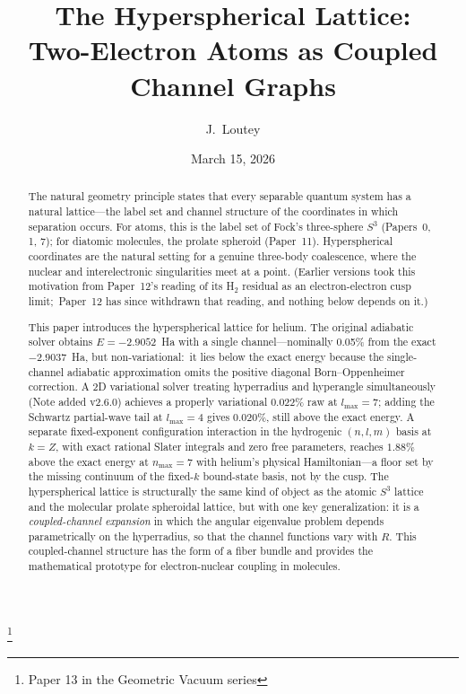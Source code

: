 \documentclass[aps,pra,twocolumn,superscriptaddress,longbibliography]{revtex4-2}
\begin{document}
\title{The Hyperspherical Lattice:\\
Two-Electron Atoms as Coupled Channel Graphs}
\thanks{Paper 13 in the Geometric Vacuum series}

\author{J.~Loutey}

\date{March 15, 2026}


\begin{abstract}
The natural geometry principle states that every separable quantum
system has a natural lattice---the label set and channel structure of
the coordinates in which separation occurs.
For atoms, this is the label set of Fock's three-sphere $S^3$ (Papers~0, 1, 7); for
diatomic molecules, the prolate spheroid (Paper~11).  Hyperspherical
coordinates are the natural setting for a genuine three-body
coalescence, where the nuclear and interelectronic singularities
meet at a point.  (Earlier versions took this motivation from
Paper~12's reading of its H$_2$ residual as an electron-electron
cusp limit;\ Paper~12 has since withdrawn that reading, and nothing
below depends on it.)

This paper introduces the hyperspherical lattice for helium.
The original adiabatic solver obtains $E = -2.9052$~Ha with a single
channel---nominally 0.05\% from the exact $-2.9037$~Ha, but
non-variational:\ it lies below the exact energy because the
single-channel adiabatic approximation omits the positive diagonal
Born--Oppenheimer correction.  A 2D variational solver treating hyperradius and
hyperangle simultaneously (Note added v2.6.0) achieves a properly
variational $0.022\%$ raw at $l_{\max} = 7$; adding the Schwartz
partial-wave tail at $l_{\max} = 4$ gives $0.020\%$, still above
the exact energy.
A separate fixed-exponent configuration interaction in the hydrogenic
$(n,l,m)$ basis at $k = Z$, with exact rational Slater integrals and
zero free parameters, reaches $1.88\%$ above the exact energy at
$n_{\max} = 7$ with helium's physical Hamiltonian---a floor set by the
missing continuum of the fixed-$k$ bound-state basis, not by the cusp.
The hyperspherical lattice is structurally
the same kind of object as the atomic $S^3$ lattice and the molecular
prolate spheroidal lattice, but with one key generalization: it is a
\emph{coupled-channel expansion} in which the angular eigenvalue
problem depends parametrically on the hyperradius, so that the channel
functions vary with $R$.  This coupled-channel structure has the form
of a fiber bundle and provides the mathematical prototype for
electron-nuclear coupling in molecules.


\end{abstract}
\end{document}
